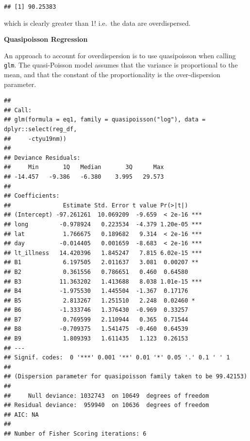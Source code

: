 \documentclass[
]{book}
\newenvironment{Shaded}{\begin{snugshade}}{\end{snugshade}}
\newcommand{\CommentTok}[1]{\textcolor[rgb]{0.56,0.35,0.01}{\textit{#1}}}
\newcommand{\DataTypeTok}[1]{\textcolor[rgb]{0.13,0.29,0.53}{#1}}
\newcommand{\KeywordTok}[1]{\textcolor[rgb]{0.13,0.29,0.53}{\textbf{#1}}}
\newcommand{\NormalTok}[1]{#1}
\newcommand{\OperatorTok}[1]{\textcolor[rgb]{0.81,0.36,0.00}{\textbf{#1}}}
\newcommand{\StringTok}[1]{\textcolor[rgb]{0.31,0.60,0.02}{#1}}
\begin{document}
\begin{verbatim}
## [1] 90.25383
\end{verbatim}

which is clearly greater than 1! i.e.~the data are overdispersed.

\textbf{Quasipoisson Regression}

An approach to account for overdispersion is to use quasipoisson when calling \texttt{glm}. The quasi-Poisson model assumes that the variance is proportional to the mean, and that the constant of the proportionality is the over-dispersion parameter.

\begin{Shaded}
\end{Shaded}

\begin{verbatim}
## 
## Call:
## glm(formula = eq1, family = quasipoisson("log"), data = dplyr::select(reg_df, 
##     -ctyu19nm))
## 
## Deviance Residuals: 
##     Min       1Q   Median       3Q      Max  
## -14.457   -9.386   -6.380    3.995   29.573  
## 
## Coefficients:
##               Estimate Std. Error t value Pr(>|t|)    
## (Intercept) -97.261261  10.069209  -9.659  < 2e-16 ***
## long         -0.978924   0.223534  -4.379 1.20e-05 ***
## lat           1.766675   0.189682   9.314  < 2e-16 ***
## day          -0.014405   0.001659  -8.683  < 2e-16 ***
## lt_illness   14.420396   1.845247   7.815 6.02e-15 ***
## B1            6.197505   2.011637   3.081  0.00207 ** 
## B2            0.361556   0.786651   0.460  0.64580    
## B3           11.363202   1.413688   8.038 1.01e-15 ***
## B4           -1.975530   1.445504  -1.367  0.17176    
## B5            2.813267   1.251510   2.248  0.02460 *  
## B6           -1.333746   1.376430  -0.969  0.33257    
## B7            0.769599   2.110944   0.365  0.71544    
## B8           -0.709375   1.541475  -0.460  0.64539    
## B9            1.809393   1.611435   1.123  0.26153    
## ---
## Signif. codes:  0 '***' 0.001 '**' 0.01 '*' 0.05 '.' 0.1 ' ' 1
## 
## (Dispersion parameter for quasipoisson family taken to be 99.42153)
## 
##     Null deviance: 1032743  on 10649  degrees of freedom
## Residual deviance:  959940  on 10636  degrees of freedom
## AIC: NA
## 
## Number of Fisher Scoring iterations: 6
\end{verbatim}
\end{document}
